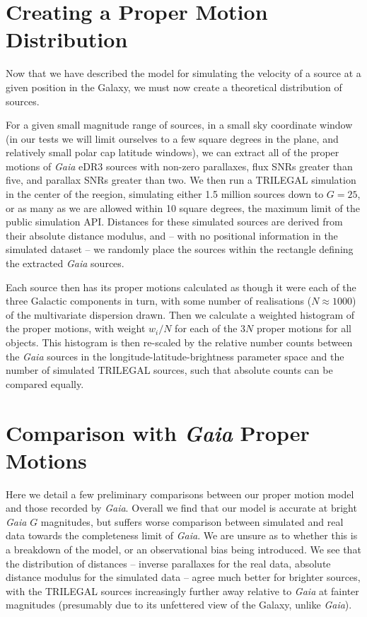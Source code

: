 \documentclass[fleqn,usenatbib]{mnras}
\begin{document}
\section{Creating a Proper Motion Distribution}
Now that we have described the model for simulating the velocity of a source at a given position in the Galaxy, we must now create a theoretical distribution of sources.

For a given small magnitude range of sources, in a small sky coordinate window (in our tests we will limit ourselves to a few square degrees in the plane, and relatively small polar cap latitude windows), we can extract all of the proper motions of \textit{Gaia} eDR3 sources with non-zero parallaxes, flux SNRs greater than five, and parallax SNRs greater than two. We then run a TRILEGAL simulation in the center of the reegion, simulating either 1.5 million sources down to $G = 25$, or as many as we are allowed within 10 square degrees, the maximum limit of the public simulation API. Distances for these simulated sources are derived from their absolute distance modulus, and -- with no positional information in the simulated dataset -- we randomly place the sources within the rectangle defining the extracted \textit{Gaia} sources.

Each source then has its proper motions calculated as though it were each of the three Galactic components in turn, with some number of realisations ($N \approx 1000$) of the multivariate dispersion drawn. Then we calculate a weighted histogram of the proper motions, with weight $w_i/N$ for each of the $3N$ proper motions for all objects. This histogram is then re-scaled by the relative number counts between the \textit{Gaia} sources in the longitude-latitude-brightness parameter space and the number of simulated TRILEGAL sources, such that absolute counts can be compared equally.

\section{Comparison with \textit{Gaia} Proper Motions}
Here we detail a few preliminary comparisons between our proper motion model and those recorded by \textit{Gaia}. Overall we find that our model is accurate at bright \textit{Gaia} $G$ magnitudes, but suffers worse comparison between simulated and real data towards the completeness limit of \textit{Gaia}. We are unsure as to whether this is a breakdown of the model, or an observational bias being introduced. We see that the distribution of distances -- inverse parallaxes for the real data, absolute distance modulus for the simulated data -- agree much better for brighter sources, with the TRILEGAL sources increasingly further away relative to \textit{Gaia} at fainter magnitudes (presumably due to its unfettered view of the Galaxy, unlike \textit{Gaia}).
\end{document}
